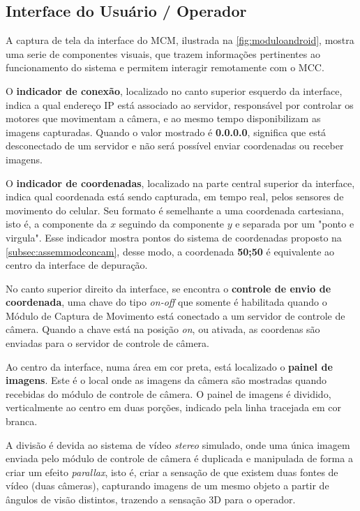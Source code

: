 \subsection{Interface do Usuário / Operador}
\label{subsec:interfaceusuariooperador}

A captura de tela da interface do MCM, ilustrada na \autoref{fig:moduloandroid}, mostra uma serie de componentes visuais, que trazem informações pertinentes ao funcionamento do sistema e permitem interagir remotamente com o MCC. \par

O \textbf{indicador de conexão}, localizado no canto superior esquerdo da interface, indica a qual endereço IP está associado ao servidor, responsável por controlar os motores que movimentam a câmera, e ao mesmo tempo disponibilizam as imagens capturadas. Quando o valor mostrado é \textbf{0.0.0.0}, significa que está desconectado de um servidor e não será possível enviar coordenadas ou receber imagens.\par

O \textbf{indicador de coordenadas}, localizado na parte central superior da interface, indica qual coordenada está sendo capturada, em tempo real, pelos sensores de movimento do celular. Seu formato é semelhante a uma coordenada cartesiana, isto é, a componente da $x$ seguindo da componente $y$ e separada por um "ponto e virgula". Esse indicador mostra pontos do sistema de coordenadas proposto na \autoref{subsec:assemmodconcam}, desse modo, a coordenada \textbf{50;50} é equivalente ao centro da interface de depuração.\par

No canto superior direito da interface, se encontra o \textbf{controle de envio de coordenada}, uma chave do tipo \textit{on-off} que somente é habilitada quando o Módulo de Captura de Movimento está conectado a um servidor de controle de câmera. Quando a chave está na posição \textit{on}, ou ativada, as coordenas são enviadas para o servidor de controle de câmera.\par

Ao centro da interface, numa área em cor preta, está localizado o \textbf{painel de imagens}. Este é o local onde as imagens da câmera são mostradas quando recebidas do módulo de controle de câmera. O painel de imagens é dividido, verticalmente ao centro em duas porções, indicado pela linha tracejada em cor branca.\par

A divisão é devida ao sistema de vídeo \textit{stereo} simulado, onde uma única imagem enviada pelo módulo de controle de câmera é duplicada e manipulada de forma a criar um efeito \textit{parallax}, isto é, criar a sensação de que existem duas fontes de vídeo (duas câmeras), capturando imagens de um mesmo objeto a partir de ângulos de visão distintos, trazendo a sensação 3D para o operador.\par

